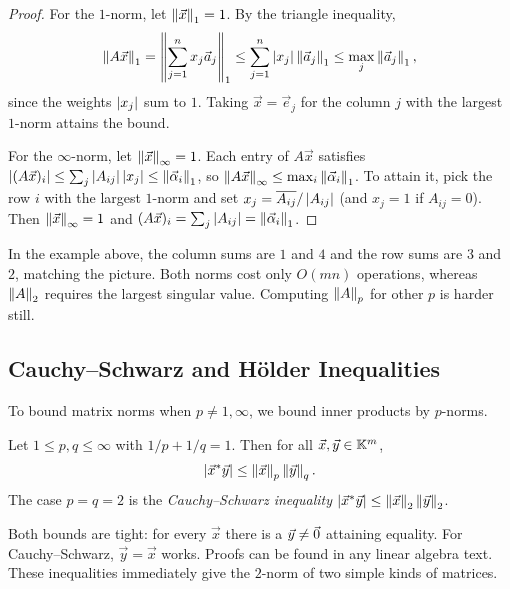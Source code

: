 \begin{proof}
  For the $1$-norm, let $\left\lVert \vec{x} \right\rVert_1 = 1$. By the triangle inequality,
  \begin{equation}
    \left\lVert A\vec{x} \right\rVert_1 = \left\lVert \sum_{j=1}^{n}x_j\vec{a}_j \right\rVert_1 \le \sum_{j=1}^{n}\left\lvert x_j \right\rvert\left\lVert \vec{a}_j \right\rVert_1 \le \max_j\left\lVert \vec{a}_j \right\rVert_1,
  \end{equation}
  since the weights $\left\lvert x_j \right\rvert$ sum to $1$. Taking $\vec{x} = \vec{e}_j$ for the column $j$ with the largest $1$-norm attains the bound.

  For the $\infty$-norm, let $\left\lVert \vec{x} \right\rVert_\infty = 1$. Each entry of $A\vec{x}$ satisfies $\left\lvert (A\vec{x})_i \right\rvert \le \sum_j\left\lvert A_{ij} \right\rvert\left\lvert x_j \right\rvert \le \left\lVert \vec{\alpha}_i \right\rVert_1$, so $\left\lVert A\vec{x} \right\rVert_\infty \le \max_i\left\lVert \vec{\alpha}_i \right\rVert_1$. To attain it, pick the row $i$ with the largest $1$-norm and set $x_j = \overline{A_{ij}}/\left\lvert A_{ij} \right\rvert$ (and $x_j = 1$ if $A_{ij} = 0$). Then $\left\lVert \vec{x} \right\rVert_\infty = 1$ and $(A\vec{x})_i = \sum_j\left\lvert A_{ij} \right\rvert = \left\lVert \vec{\alpha}_i \right\rVert_1$.
\end{proof}

In the example above, the column sums are $1$ and $4$ and the row sums are $3$ and $2$, matching the picture. Both norms cost only $O(mn)$ operations, whereas $\left\lVert A \right\rVert_2$ requires the largest singular value. Computing $\left\lVert A \right\rVert_p$ for other $p$ is harder still.

\subsection{Cauchy--Schwarz and H\"older Inequalities}

To bound matrix norms when $p \ne 1, \infty$, we bound inner products by $p$-norms.

\begin{theorem}
  \label{thm:holder}
  Let $1 \le p, q \le \infty$ with $1/p + 1/q = 1$. Then for all $\vec{x}, \vec{y} \in \mathbb{K}^m$,
  \begin{equation}
    \left\lvert \vec{x}^\ast\vec{y} \right\rvert \le \left\lVert \vec{x} \right\rVert_p\left\lVert \vec{y} \right\rVert_q.
  \end{equation}
  The case $p = q = 2$ is the \emph{Cauchy--Schwarz inequality} $\left\lvert \vec{x}^\ast\vec{y} \right\rvert \le \left\lVert \vec{x} \right\rVert_2\left\lVert \vec{y} \right\rVert_2$.
\end{theorem}

Both bounds are tight: for every $\vec{x}$ there is a $\vec{y} \ne \vec{0}$ attaining equality. For Cauchy--Schwarz, $\vec{y} = \vec{x}$ works. Proofs can be found in any linear algebra text. These inequalities immediately give the $2$-norm of two simple kinds of matrices.


